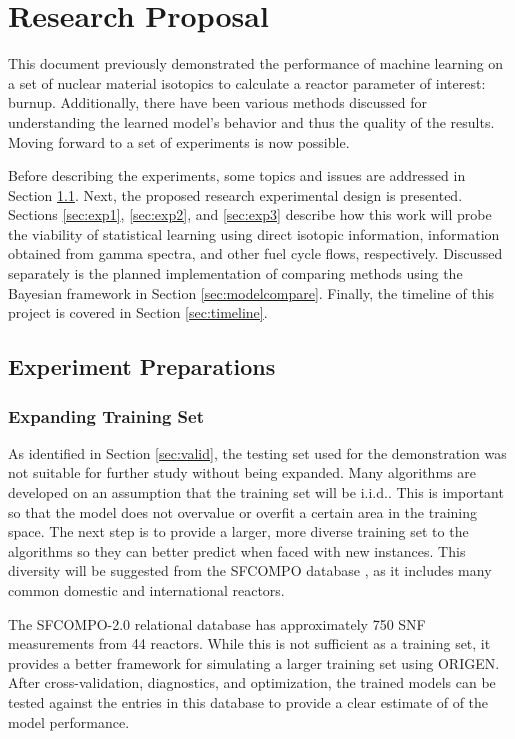 \chapter{Research Proposal}
\label{ch:proposal}

This document previously demonstrated the performance of machine learning on a
set of nuclear material isotopics to calculate a reactor parameter of interest:
burnup.  Additionally, there have been various methods discussed for
understanding the learned model's behavior and thus the quality of the results.
Moving forward to a set of experiments is now possible.

Before describing the experiments, some topics and issues are addressed in
Section \ref{sec:prep}.  Next, the proposed research experimental design is
presented. Sections \ref{sec:exp1}, \ref{sec:exp2}, and \ref{sec:exp3} describe
how this work will probe the viability of statistical learning using direct
isotopic information, information obtained from gamma spectra, and other fuel
cycle flows, respectively.  Discussed separately is the planned implementation
of comparing methods using the Bayesian framework in Section
\ref{sec:modelcompare}. Finally, the timeline of this project is covered in
Section \ref{sec:timeline}.

\section{Experiment Preparations}
\label{sec:prep}

\subsection*{Expanding Training Set}

As identified in Section \ref{sec:valid}, the testing set used for the
demonstration was not suitable for further study without being expanded.  Many
algorithms are developed on an assumption that the training set will be
\gls{i.i.d.}.  This is important so that the model does not overvalue or
overfit a certain area in the training space.  The next step is to provide a
larger, more diverse training set to the algorithms so they can better predict
when faced with new instances. This diversity will be suggested from the
\gls{SFCOMPO} database \cite{sfcompo}, as it includes many common domestic and 
international reactors.

The SFCOMPO-2.0 relational database \cite{sfcompo} has approximately 750
\gls{SNF} measurements from 44 reactors. While this is not sufficient as a
training set, it provides a better framework for simulating a larger training
set using \gls{ORIGEN}.  After cross-validation, diagnostics, and optimization,
the trained models can be tested against the entries in this database to
provide a clear estimate of of the model performance. 


